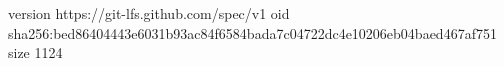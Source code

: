 version https://git-lfs.github.com/spec/v1
oid sha256:bed86404443e6031b93ac84f6584bada7c04722dc4e10206eb04baed467af751
size 1124
